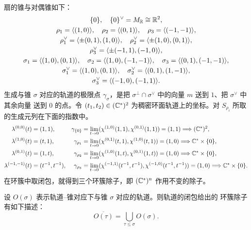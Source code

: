 \begin{example}[$\PP^2$]\label{ex:cp2-cones}
扇的锥与对偶锥如下：
\begin{gather*}
\{0\},\quad \{0\}^\vee = M_{\mathbb{R}}\cong\mathbb{R}^2,\\
\rho_1 = \langle(1,0)\rangle,\quad \rho_2 = \langle(0,1)\rangle,\quad
\rho_3 = \langle(-1,-1)\rangle,\\
\rho_1^\vee = \langle\pm(0,1),(1,0)\rangle,\quad
\rho_2^\vee = \langle\pm(1,0),(0,1)\rangle,\\
\rho_3^\vee = \langle\pm(-1,1),(-1,0)\rangle,\\
\sigma_1 = \langle(1,0),(0,1)\rangle,\quad
\sigma_2 = \langle(1,0),(-1,-1)\rangle,\quad
\sigma_3 = \langle(0,1),(-1,-1)\rangle,\\
\sigma_1^\vee = \langle(1,0),(0,1)\rangle,\quad
\sigma_2^\vee = \langle(0,1),(1,-1)\rangle,\\
\sigma_3^\vee = \langle(-1,0),(-1,1)\rangle.
\end{gather*}
生成与锥 $\sigma$ 对应的轨道的极限点 $\gamma_\sigma$，是把
$\sigma^\perp\cap\sigma^\vee$ 中的向量 $m$ 送到 $1$、把 $\sigma^\vee$ 中其余向量
送到 $0$ 的点。令 $(t_1,t_2)\in(\mathbb{C}^*)^2$ 为稠密环面轨道上的坐标。对 $S_{\rho_i}$
所取的生成元列在下面的指数中。
\begin{align*}
\lambda^{(0,0)}(t) &= (1,1), &
\gamma_{\{0\}} &= \lim_{t\to0}(\chi^{(1,0)}(1,1),\chi^{(0,1)}(1,1))
= (1,1) \Longrightarrow (\mathbb{C}^*)^2,\\
\lambda^{(1,0)}(t) &= (t,1), &
\gamma_{\rho_1} &= \lim_{t\to0}(\chi^{(0,1)}(t,1),\chi^{(1,0)}(t,1))
= (1,0) \Longrightarrow \mathbb{C}^*\times\{0\},\\
\lambda^{(0,1)}(t) &= (1,t), &
\gamma_{\rho_2} &= \lim_{t\to0}(\chi^{(1,0)}(1,t),\chi^{(0,1)}(1,t))
= (1,0) \Longrightarrow \mathbb{C}^*\times\{0\},\\
\lambda^{(-1,-1)}(t) &= (t^{-1},t^{-1}), &
\gamma_{\rho_3} &= \lim_{t\to0}(\chi^{(-1,1)}(t^{-1},t^{-1}),
\chi^{(-1,0)}(t^{-1},t^{-1})) = (1,0) \Longrightarrow \mathbb{C}^*\times\{0\}.
\end{align*}
在环簇中取闭包，就得到三个环簇除子，即 $(\mathbb{C}^*)^n$ 作用不变的除子。
\end{example}


\begin{claim}\label{claim:orbit-closure}
设 $O(\sigma)$ 表示轨道–锥对应下与锥 $\sigma$ 对应的轨道。则轨道的闭包给出的
环簇除子有如下描述：
\[
\overline{O(\tau)} = \bigcup_{\tau\le\sigma} O(\sigma).
\]
\end{claim}

